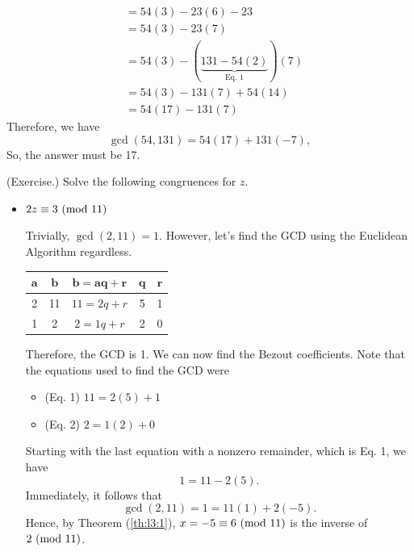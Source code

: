 \documentclass[letterpaper]{article}
\begin{document}
\begin{mdframed}
\begin{mdframed}
\begin{equation*}
\begin{aligned}
                    &= 54(3) - 23(6) - 23 \\ 
                    &= 54(3) - 23(7) \\ 
                    &= 54(3) - (\underbrace{131 - 54(2)}_{\text{Eq. 1}})(7) \\ 
                    &= 54(3) - 131(7) + 54(14) \\ 
                    &= 54(17) - 131(7)
            \end{aligned}
        \end{equation*}
        Therefore, we have 
        \[\gcd(54, 131) = 54(17) + 131(-7),\]
        So, the answer must be 17. 
    \end{mdframed}
\end{mdframed}

\begin{mdframed}
    (Exercise.) Solve the following congruences for $z$. 
    \begin{itemize}
        \item $2z \equiv 3 \ (\mathrm{mod}\ 11)$
        \begin{mdframed}
            Trivially, $\gcd(2, 11) = 1$. However, let's find the GCD using the Euclidean Algorithm regardless.
            \begin{center}
                \begin{tabular}{|c|c|c|c|c|}
                    \hline 
                    $\mathbf{a}$ & $\mathbf{b}$ & $\mathbf{b = aq + r}$ & $\mathbf{q}$ & $\mathbf{r}$ \\ 
                    \hline 
                    2 & 11 & $11 = 2q + r$ & 5 & 1 \\ 
                    1 & 2 & $2 = 1q + r$ & 2 & 0 \\ 
                    \hline 
                \end{tabular}
            \end{center}
            Therefore, the GCD is 1. We can now find the Bezout coefficients. Note that the equations used to find the GCD were 
            \begin{itemize}
                \item (Eq. 1) $11 = 2(5) + 1$
                \item (Eq. 2) $2 = 1(2) + 0$
            \end{itemize} 
            Starting with the last equation with a nonzero remainder, which is Eq. 1, we have 
            \[1 = 11 - 2(5).\]
            Immediately, it follows that 
            \[\gcd(2, 11) = 1 = 11(1) + 2(-5).\]
            Hence, by Theorem (\ref{th:l3:1}), $x = -5 \equiv 6 \ (\mathrm{mod}\ 11)$ is the inverse of $2 \ (\mathrm{mod}\ 11)$.


\end{mdframed}
\end{itemize}
\end{mdframed}
\end{document}
